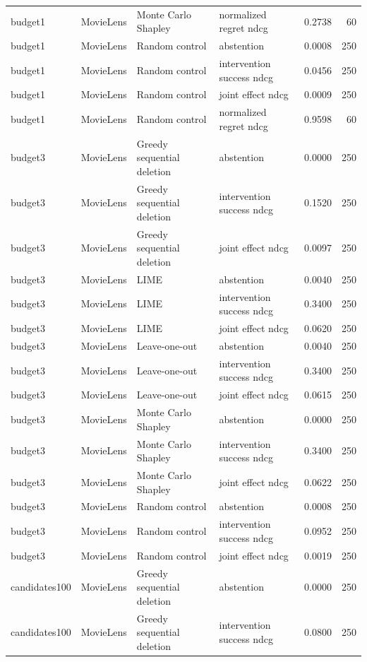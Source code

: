 \begin{longtable}{@{}p{.16\linewidth}p{.11\linewidth}p{.15\linewidth}p{.22\linewidth}rr@{}}
budget1 & MovieLens & Monte Carlo Shapley & normalized regret ndcg & 0.2738 & 60 \\
budget1 & MovieLens & Random control & abstention & 0.0008 & 250 \\
budget1 & MovieLens & Random control & intervention success ndcg & 0.0456 & 250 \\
budget1 & MovieLens & Random control & joint effect ndcg & 0.0009 & 250 \\
budget1 & MovieLens & Random control & normalized regret ndcg & 0.9598 & 60 \\
budget3 & MovieLens & Greedy sequential deletion & abstention & 0.0000 & 250 \\
budget3 & MovieLens & Greedy sequential deletion & intervention success ndcg & 0.1520 & 250 \\
budget3 & MovieLens & Greedy sequential deletion & joint effect ndcg & 0.0097 & 250 \\
budget3 & MovieLens & LIME & abstention & 0.0040 & 250 \\
budget3 & MovieLens & LIME & intervention success ndcg & 0.3400 & 250 \\
budget3 & MovieLens & LIME & joint effect ndcg & 0.0620 & 250 \\
budget3 & MovieLens & Leave-one-out & abstention & 0.0040 & 250 \\
budget3 & MovieLens & Leave-one-out & intervention success ndcg & 0.3400 & 250 \\
budget3 & MovieLens & Leave-one-out & joint effect ndcg & 0.0615 & 250 \\
budget3 & MovieLens & Monte Carlo Shapley & abstention & 0.0000 & 250 \\
budget3 & MovieLens & Monte Carlo Shapley & intervention success ndcg & 0.3400 & 250 \\
budget3 & MovieLens & Monte Carlo Shapley & joint effect ndcg & 0.0622 & 250 \\
budget3 & MovieLens & Random control & abstention & 0.0008 & 250 \\
budget3 & MovieLens & Random control & intervention success ndcg & 0.0952 & 250 \\
budget3 & MovieLens & Random control & joint effect ndcg & 0.0019 & 250 \\
candidates100 & MovieLens & Greedy sequential deletion & abstention & 0.0000 & 250 \\
candidates100 & MovieLens & Greedy sequential deletion & intervention success ndcg & 0.0800 & 250 \\

\end{longtable}
